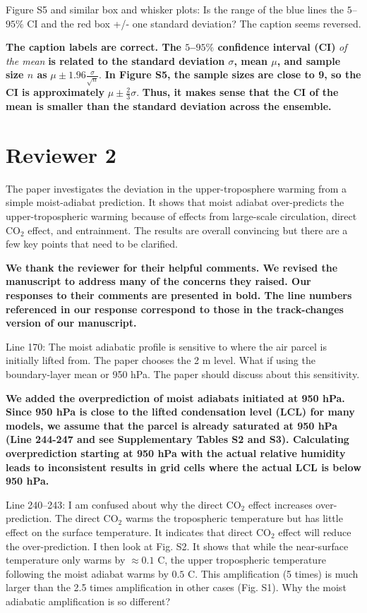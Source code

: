 \documentclass[11pt]{article}
\begin{document}
Figure S5 and similar box and whisker plots: Is the range of the blue lines the \(5\)--\(95\%\) CI and the red box +/- one standard deviation? The caption seems reversed.

\textbf{The caption labels are correct. The \(5\)--\(95\%\) confidence interval (CI)} \emph{of the mean} \textbf{is related to the standard deviation \(\sigma\), mean \(\mu\), and sample size \(n\) as} \(\mu\pm1.96\frac{\sigma}{\sqrt{n}}\). \textbf{In Figure S5, the sample sizes are close to 9, so the CI is approximately} \(\mu\pm\frac{2}{3}\sigma\). \textbf{Thus, it makes sense that the CI of the mean is smaller than the standard deviation across the ensemble.}

\section*{Reviewer 2}
\label{sec:org87f388d}

The paper investigates the deviation in the upper-troposphere warming from a simple moist-adiabat prediction. It shows that moist adiabat over-predicts the upper-tropospheric warming because of effects from large-scale circulation, direct CO\(_2\) effect, and entrainment. The results are overall convincing but there are a few key points that need to be clarified.

\textbf{We thank the reviewer for their helpful comments. We revised the manuscript to address many of the concerns they raised. Our responses to their comments are presented in bold. The line numbers referenced in our response correspond to those in the track-changes version of our manuscript.}

Line 170: The moist adiabatic profile is sensitive to where the air parcel is initially lifted from. The paper chooses the 2 m level. What if using the boundary-layer mean or 950 hPa. The paper should discuss about this sensitivity.

\textbf{We added the overprediction of moist adiabats initiated at 950 hPa. Since 950 hPa is close to the lifted condensation level (LCL) for many models, we assume that the parcel is already saturated at 950 hPa (Line 244-247 and see Supplementary Tables S2 and S3). Calculating overprediction starting at 950 hPa with the actual relative humidity leads to inconsistent results in grid cells where the actual LCL is below 950 hPa.}

Line 240--243: I am confused about why the direct CO\(_2\) effect increases over-prediction. The direct CO\(_2\) warms the tropospheric temperature but has little effect on the surface temperature. It indicates that direct CO\(_2\) effect will reduce the over-prediction. I then look at Fig. S2. It shows that while the near-surface temperature only warms by \(\approx0.1\) C, the upper tropospheric temperature following the moist adiabat warms by \(0.5\) C. This amplification (5 times) is much larger than the 2.5 times amplification in other cases (Fig. S1). Why the moist adiabatic amplification is so different?
\end{document}
